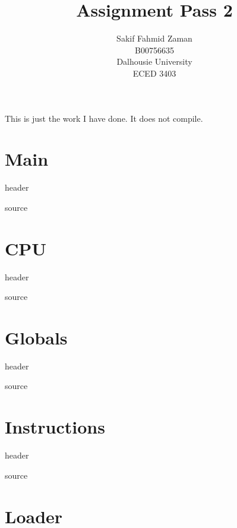 \documentclass[10pt]{article}
\title{Assignment Pass 2}
\author{Sakif Fahmid Zaman\\B00756635\\Dalhousie University\\ECED 3403}
\begin{document}
\maketitle
\tableofcontents
This is just the work I have done. It does not compile.
\section{Main}
header

source


\section{CPU}
header

source


\section{Globals}
header

source


\section{Instructions}
header

source


\section{Loader}

\end{document}
